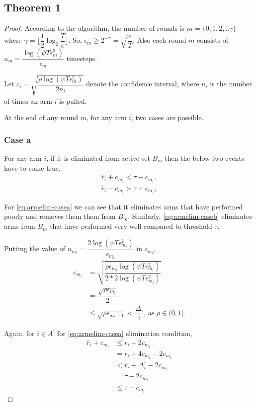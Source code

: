 \subsection{Theorem 1}

\begin{proof}

According to the algorithm, the number of rounds is $m=\lbrace 0,1,2,.. \gamma\rbrace $ where $\gamma=\big\lfloor \dfrac{1}{2}\log_{2} \dfrac{T}{e}\big\rfloor$. So, $\epsilon_{m}\geq 2^{-\gamma} = \sqrt{\dfrac{e}{T}}$. Also each round $m$ consists of $n_{m} = \dfrac{\log(\psi T \epsilon_{m}^{2})}{\epsilon_{m}}$ timesteps.

Let $c_{i}= \sqrt{\dfrac{\rho\log{(\psi T\epsilon_{m}^{2})}}{2 n_{i}}}$ denote the confidence interval, where $n_{i}$ is the number of times an arm $i$ is pulled.

At the end of any round $m$, for any arm $i$, two cases are possible.

\subsubsection{Case a}
For any arm $i$, if it is eliminated from active set $B_{m}$ then the below two events have to come true,
\begin{align}
\hat{r}_{i} + c_{m_{i}} < \tau - c_{m_{i}}, \label{eq:armelim-casea}\\
\hat{r}_{i} - c_{m_{i}} > \tau + c_{m_{i}}, \label{eq:armelim-caseb}
\end{align}

For \ref{eq:armelim-casea} we can see that it eliminates arms that have performed poorly and removes them them from $B_{m}$. Similarly, \ref{eq:armelim-caseb} eliminates arms from $B_{m}$ that have performed very well compared to threshold $\tau$.

Putting the value of $n_{m_{i}}=\dfrac{2\log{(\psi T\epsilon_{m_{i}}^{2})}}{\epsilon_{m_{i}}}$ in $c_{m_{i}}$,
\begin{align*}
c_{m_{i}}&=\sqrt{\dfrac{\rho\epsilon_{m_{i}}\log (\psi T\epsilon_{m_{i}}^{2})}{2*2 \log(\psi T\epsilon_{m_{i}}^{2})}}\\
& =\dfrac{\sqrt{\rho\epsilon_{m_{i}}}}{2}\\
& \leq \sqrt{\rho\epsilon_{m_{i}+1}} < \dfrac{\Delta_{i}}{4} \text{, as }\rho\in (0,1].
\end{align*}


Again, for ${i} \in A^{'}$ for \ref{eq:armelim-casea} elimination condition, 
\begin{align*}
\hat{r}_{i} + c_{m_{i}}&\leq r_{i} + 2c_{m_{i}} \\
&= r_{i} + 4c_{m_{i}} - 2c_{m_{i}} \\
&< r_{i} + \Delta_{i}^{\tau} - 2c_{m_{i}}\\
&= \tau -2c_{m_{i}} \\
&\leq \tau - c_{m_{i}}
\end{align*}


\end{proof}
